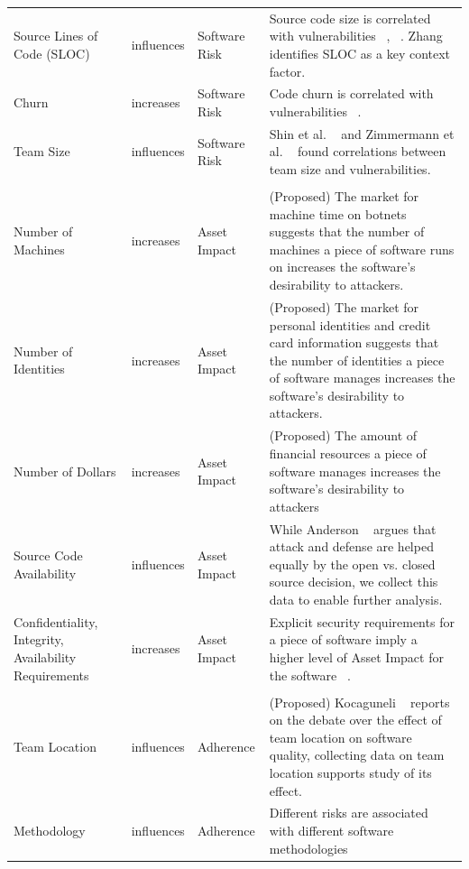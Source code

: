 \begin{table}[!htbp]
\begin{scriptsize}
\begin{tabular}{p{1.75cm}p{1cm}p{1cm}p{6cm}}
			Source Lines of Code (SLOC)	& influences	& Software Risk & Source code size is correlated with vulnerabilities ~\cite{shin2011evaluating}, ~\cite{alhazmi2007measuring}. Zhang~\cite{zhang2014towards} identifies SLOC as a key context factor. \\
			Churn &	increases &	Software Risk  &  Code churn is correlated with vulnerabilities ~\cite{shin2011evaluating}.\\
			Team Size	& influences	& Software Risk & Shin et al. ~\cite{shin2011evaluating} and Zimmermann et al. ~\cite{zimmerman2010searching} found correlations between team size and vulnerabilities. \\			
			\hline \\[-1.8ex] 
			Number of Machines &	increases &	Asset Impact & (Proposed) The market for machine time on botnets suggests that the number of machines a piece of software runs on increases the software's desirability to attackers. \\
			Number of Identities &	increases &	Asset Impact	 &  (Proposed) The market for personal identities and credit card information suggests that the number of identities a piece of software manages increases the software's desirability to attackers.\\
			Number of Dollars &	increases &	Asset Impact	 & (Proposed) The amount of financial resources a piece of software manages increases the software's desirability to attackers\\
			Source Code Availability	& influences &	Asset Impact & While Anderson ~\cite{anderson2002security} argues that attack and defense
			are helped equally by the open vs. closed source decision, we collect this data to enable further analysis.  \\
			Confidentiality, Integrity, Availability Requirements &	increases &	Asset Impact	& Explicit security requirements for a piece of software imply a higher level of Asset Impact for the software ~\cite{mell2007complete}. \\
			\hline \\[-1.8ex]
			Team Location &	influences &	Adherence	& (Proposed)  Kocaguneli ~\cite{kocaguneli2013distributed} reports on the debate over the effect of team location on software quality, collecting data on team location supports study of its effect. \\
			Methodology	& influences &	Adherence	& Different risks are associated with different software methodologies~\cite{williams2004xpef,jones2000software} \\

\end{tabular}
\end{scriptsize}
\end{table}
